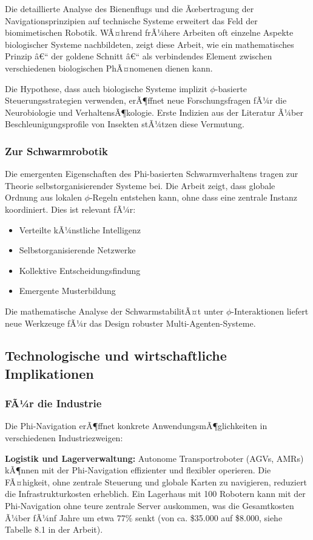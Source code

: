 ﻿\documentclass[a4paper,12pt]{article}
\theoremstyle{definition}
\begin{document}
Die detaillierte Analyse des Bienenflugs und die Ãœbertragung der Navigationsprinzipien auf technische Systeme erweitert das Feld der biomimetischen Robotik. WÃ¤hrend frÃ¼here Arbeiten oft einzelne Aspekte biologischer Systeme nachbildeten, zeigt diese Arbeit, wie ein mathematisches Prinzip â€“ der goldene Schnitt â€“ als verbindendes Element zwischen verschiedenen biologischen PhÃ¤nomenen dienen kann.

Die Hypothese, dass auch biologische Systeme implizit $\phi$-basierte Steuerungsstrategien verwenden, erÃ¶ffnet neue Forschungsfragen fÃ¼r die Neurobiologie und VerhaltensÃ¶kologie. Erste Indizien aus der Literatur Ã¼ber Beschleunigungsprofile von Insekten stÃ¼tzen diese Vermutung.

\subsubsection{Zur Schwarmrobotik}

Die emergenten Eigenschaften des Phi-basierten Schwarmverhaltens tragen zur Theorie selbstorganisierender Systeme bei. Die Arbeit zeigt, dass globale Ordnung aus lokalen $\phi$-Regeln entstehen kann, ohne dass eine zentrale Instanz koordiniert. Dies ist relevant fÃ¼r:
\begin{itemize}
	\item Verteilte kÃ¼nstliche Intelligenz
	\item Selbstorganisierende Netzwerke
	\item Kollektive Entscheidungsfindung
	\item Emergente Musterbildung
\end{itemize}

Die mathematische Analyse der SchwarmstabilitÃ¤t unter $\phi$-Interaktionen liefert neue Werkzeuge fÃ¼r das Design robuster Multi-Agenten-Systeme.

\subsection{Technologische und wirtschaftliche Implikationen}

\subsubsection{FÃ¼r die Industrie}

Die Phi-Navigation erÃ¶ffnet konkrete AnwendungsmÃ¶glichkeiten in verschiedenen Industriezweigen:

\textbf{Logistik und Lagerverwaltung:} Autonome Transportroboter (AGVs, AMRs) kÃ¶nnen mit der Phi-Navigation effizienter und flexibler operieren. Die FÃ¤higkeit, ohne zentrale Steuerung und globale Karten zu navigieren, reduziert die Infrastrukturkosten erheblich. Ein Lagerhaus mit 100 Robotern kann mit der Phi-Navigation ohne teure zentrale Server auskommen, was die Gesamtkosten Ã¼ber fÃ¼nf Jahre um etwa 77\% senkt (von ca. \$35.000 auf \$8.000, siehe Tabelle 8.1 in der Arbeit).
\end{document}
